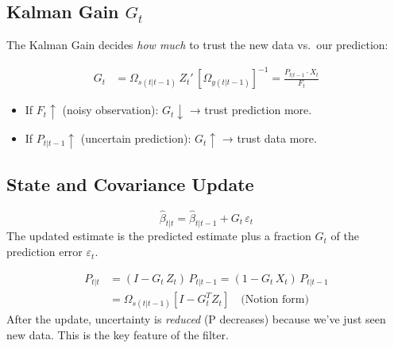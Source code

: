 \documentclass[10pt,a4paper,twocolumn]{article}
\begin{document}
\subsection{Kalman Gain $G_t$}

The Kalman Gain decides \emph{how much} to trust the new data vs.\ our prediction:

\begin{tcolorbox}[mathbox={Formula 5 --- Kalman Gain $G_t$}]
\vspace{-4pt}
\begin{align}
  G_t &= \Omega_{s(t|t-1)}\,Z_t'\,[\Omega_{y(t|t-1)}]^{-1}
       = \frac{P_{t|t-1}\cdot X_t}{F_t}
  \label{eq:kg}
\end{align}
\vspace{-4pt}
\begin{itemize}\setlength\itemsep{0pt}
  \item If $F_t \uparrow$ (noisy observation): $G_t \downarrow$ → trust prediction more.
  \item If $P_{t|t-1} \uparrow$ (uncertain prediction): $G_t \uparrow$ → trust data more.
\end{itemize}
\end{tcolorbox}

\subsection{State and Covariance Update}

\begin{tcolorbox}[mathbox={Formula 6 --- State Update}]
\vspace{-4pt}
\begin{equation}
  \hat\beta_{t|t} = \hat\beta_{t|t-1} + G_t\,\varepsilon_t
  \label{eq:state_upd}
\end{equation}
\vspace{-4pt}
The updated estimate is the predicted estimate plus a fraction $G_t$
of the prediction error $\varepsilon_t$.
\end{tcolorbox}

\begin{tcolorbox}[mathbox={Formula 7 --- Covariance Update}]
\vspace{-4pt}
\begin{align}
  P_{t|t} &= (I - G_t\,Z_t)\,P_{t|t-1}
           = (1 - G_t\,X_t)\,P_{t|t-1} \label{eq:cov_upd}\\
  &= \Omega_{s(t|t-1)}[I - G_t^T Z_t] \quad \text{(Notion form)}
\end{align}
\vspace{-4pt}
After the update, uncertainty is \emph{reduced} (P decreases) because
we've just seen new data.  This is the key feature of the filter.
\end{tcolorbox}
\end{document}

